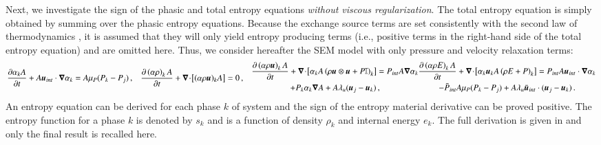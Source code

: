 Next, we investigate the sign of the phasic and total entropy equations \emph{without viscous regularization}. The total entropy equation is simply 
obtained by summing over the phasic entropy equations. Because the exchange source terms are set consistently with the second 
law of thermodynamics \cite{BaerNunziato,PassmanNunziato}, it is assumed that they will only yield entropy producing terms (i.e., positive 
terms in the right-hand side of the total entropy equation) and are omitted here. Thus, we consider hereafter the SEM model with only 
pressure and velocity relaxation terms:
\begin{subequations}\label{eq:liq-7-eqn-sect5_no_exchange}
\begin{align}
  \label{eqn:multi-d-7-eqn-liq-vol_no_exchange}
  \frac{\partial \alpha_{k} A}{\partial t} + A\mbold u_{int} \cdot \grad \alpha_{k}
  &= A \mu_P (P_{k} - P_{j}) \,,
\end{align}
\begin{align}
  \label{multi-d-7-equ-liq_no_exchange}
  \frac{\partial \left( \alpha \rho \right)_{k} A}{\partial t}
  + \div \left[ (\alpha \rho \mbold u)_{k} A \right]
  &= 0 \,,
\end{align}
\begin{multline}
  \frac{\partial \left( \alpha \rho \mbold u \right)_{k} A}{\partial t}
  + \div \left[ \alpha_{k} A \left( \rho \mbold u \otimes \mbold u + P \mathbb{I} \right)_{k} \right]
  = P_{int} A \grad \alpha_{k} \\ + P_{k} \alpha_{k} \grad A
  + A \lambda_u (\mbold u_{j} - \mbold u_{k})\,,
\end{multline}
\begin{multline}
  \frac{\partial \left( \alpha \rho E \right)_{k} A}{\partial t}
  + \div \left[ \alpha_{k} \mbold u_{k} A \left( \rho E + P \right)_{k} \right]
  = P_{int} A \mbold u_{int} \cdot \grad \alpha_{k} \\ - \bar{P}_{int} A \mu_P (P_{k} - P_{j})
  + A \lambda_u \bar{\mbold u}_{int} \cdot (\mbold u_{j} - \mbold u_{k}) \,.
\end{multline}
\end{subequations}
%
An entropy equation can be derived for each phase $k$ of system 
%
and the sign of the entropy material derivative can be proved positive. The entropy function for a phase $k$ is denoted by $s_k$ and is a function of 
density $\rho_k$ and internal energy $e_k$. The full derivation is given in  and only the final result is recalled here. 
